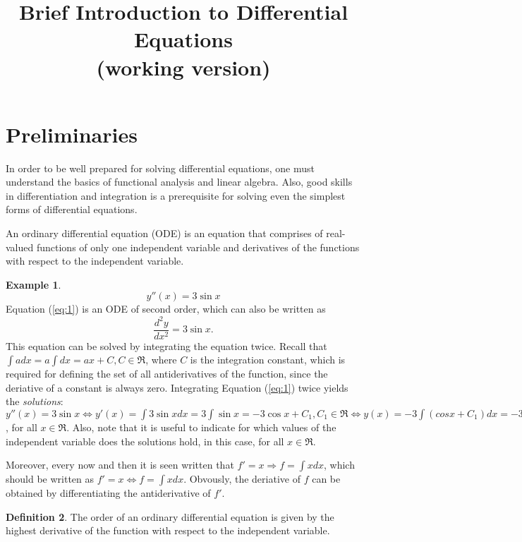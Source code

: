 \documentclass[10pt,a4paper]{article}
\theoremstyle{definition}
\newtheorem{defn}{Definition}[section]
\newtheorem{example}[defn]{Example}
\begin{document}
\title{Brief Introduction to Differential Equations\\ (working version)}
\maketitle
\tableofcontents
\section{Preliminaries}
In order to be well prepared for solving differential equations, one must
understand the basics of functional analysis and linear algebra. Also, good
skills in differentiation and integration is a prerequisite for solving even
the simplest forms of differential equations.

An ordinary differential equation (ODE) is an equation that comprises of
real-valued functions of only one independent variable and derivatives of the
functions with respect to the independent variable.
\begin{example}
\begin{equation} \label{eq:1}
  y''(x) = 3 \sin x 
\end{equation}
Equation (\ref{eq:1}) is an ODE of second order, which can also be written as
\[
  \frac{d^2y}{dx^2} = 3 \sin x.
\]
This equation can be solved by integrating the equation twice. Recall that
$\int a dx = a \int dx = a x + C, C \in \Re$, where $C$ is the integration
constant, which is required for defining the set of all antiderivatives of the
function, since the deriative of a constant is always zero. Integrating
Equation (\ref{eq:1}) twice yields the \emph{solutions}: $y''(x) = 3 \sin x
\Leftrightarrow y'(x) = \int 3 \sin x dx = 3 \int \sin x = -3 \cos x + C_1, C_1
\in \Re \Leftrightarrow y (x) = -3 \int (cos x + C_1) dx = -3 \sin x + C_1 x +
C_2, C_2 \in \Re$, for all $x \in \Re$. Also, note that it is useful to
indicate for which values of the independent variable does the solutions hold,
in this case, for all $x \in \Re$. 

Moreover, every now and then it is seen written that $f' = x \Rightarrow f =
\int x dx$, which should be written as $f' = x \Leftrightarrow f = \int x dx$.
Obvously, the deriative of $f$ can be obtained by differentiating the
antiderivative of $f'$.
\end{example}
\begin{defn}
The order of an ordinary differential equation is given by the highest
derivative of the function with respect to the independent variable.
\end{defn}
\end{document}
